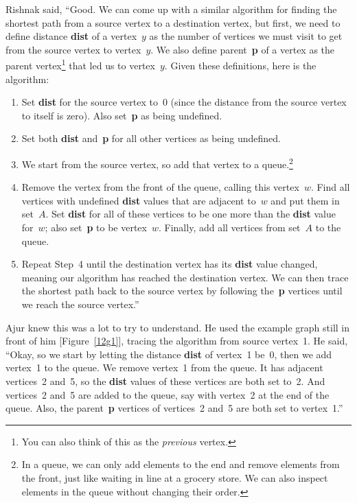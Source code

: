 Rishnak said, ``Good. We can come up with a similar algorithm for finding the shortest path from a source vertex to a destination vertex, but first, we need to define distance \textbf{dist} of a vertex~$y$ as the number of vertices we must visit to get from the source vertex to vertex~$y$. We also define parent~\textbf{p} of a vertex as the parent vertex\footnote{You can also think of this as the \textit{previous} vertex.} that led us to vertex~$y$. Given these definitions, here is the algorithm:
\begin{enumerate}
\item Set \textbf{dist} for the source vertex to~0 (since the distance from the source vertex to itself is zero). Also set~\textbf{p} as being undefined.
\item Set both \textbf{dist} and~\textbf{p} for all other vertices as being undefined.
\item We start from the source vertex, so add that vertex to a queue.\footnote{In a queue, we can only add elements to the end and remove elements from the front, just like waiting in line at a grocery store. We can also inspect elements in the queue without changing their order.}
\item Remove the vertex from the front of the queue, calling this vertex~$w$. Find all vertices with undefined \textbf{dist} values that are adjacent to~$w$ and put them in set~$A$. Set \textbf{dist} for all of these vertices to be one more than the \textbf{dist} value for~$w$; also set~\textbf{p} to be vertex~$w$. Finally, add all vertices from set~$A$ to the queue.
\item Repeat Step~4 until the destination vertex has its \textbf{dist} value changed, meaning our algorithm has reached the destination vertex. We can then trace the shortest path back to the source vertex by following the~\textbf{p} vertices until we reach the source vertex.''
\end{enumerate}

Ajur knew this was a lot to try to understand. He used the example graph still in front of him [Figure~\ref{12g1}], tracing the algorithm from source vertex~1. He said, ``Okay, so we start by letting the distance \textbf{dist} of vertex~1 be~0, then we add vertex~1 to the queue. We remove vertex~1 from the queue. It has adjacent vertices~2 and~5, so the \textbf{dist} values of these vertices are both set to~2. And vertices~2 and~5 are added to the queue, say with vertex~2 at the end of the queue. Also, the parent~\textbf{p} vertices of vertices~2 and~5 are both set to vertex~1.''

